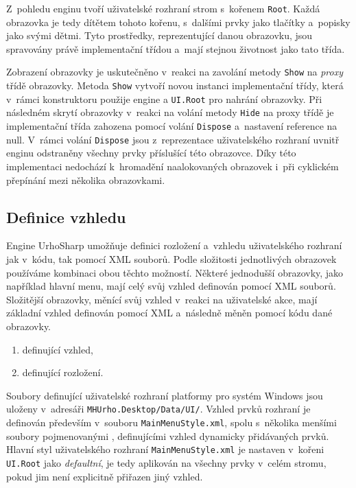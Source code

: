 Z~pohledu enginu tvoří uživatelské rozhraní strom s~kořenem \texttt{Root}. Každá obrazovka je tedy dítětem tohoto kořenu, s~dalšími prvky jako tlačítky a~popisky jako svými dětmi. Tyto prostředky, reprezentující danou obrazovku, jsou spravovány právě implementační třídou a~mají stejnou životnost jako tato třída.

Zobrazení obrazovky je uskutečněno v~reakci na zavolání metody \texttt{Show} na \textit{proxy} třídě obrazovky. Metoda \texttt{Show} vytvoří novou instanci implementační třídy, která v~rámci konstruktoru použije engine a \texttt{UI.Root} pro nahrání obrazovky. Při následném skrytí obrazovky v~reakci na volání metody \texttt{Hide} na proxy třídě je implementační třída zahozena pomocí volání \texttt{Dispose} a~nastavení reference na null. V~rámci volání \texttt{Dispose} jsou z~reprezentace uživatelského rozhraní uvnitř enginu odstraněny všechny prvky příslušící této obrazovce. Díky této implementaci nedochází k~hromadění naalokovaných obrazovek i~při cyklickém přepínání mezi několika obrazovkami.



\subsection{Definice vzhledu}
Engine UrhoSharp umožňuje definici rozložení a~vzhledu uživatelského rozhraní jak v~kódu, tak pomocí XML souborů. Podle složitosti jednotlivých obrazovek používáme kombinaci obou těchto možností. Některé jednodušší obrazovky, jako například hlavní menu, mají celý svůj vzhled definován pomocí XML souborů. Složitější obrazovky, měnící svůj vzhled v~reakci na uživatelské akce, mají základní vzhled definován pomocí XML a~následně měněn pomocí kódu dané obrazovky. 

\begin{enumerate}
	\item definující vzhled,
	\item definující rozložení.
\end{enumerate}

Soubory definující uživatelské rozhraní platformy pro systém Windows jsou uloženy v~adresáři \texttt{MHUrho.Desktop/Data/UI/}.
Vzhled prvků rozhraní je definován především v~souboru \texttt{MainMenuStyle.xml}, spolu s~několika menšími soubory pojmenovanými , definujícími vzhled dynamicky přidávaných prvků. Hlavní styl uživatelského rozhraní \texttt{MainMenuStyle.xml} je nastaven v~kořeni \texttt{UI.Root} jako \textit{defaultní}, je tedy aplikován na všechny prvky v~celém stromu, pokud jim není explicitně přiřazen jiný vzhled.

